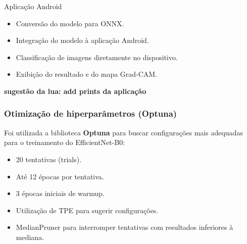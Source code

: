 \begin{frame}{Aplicação Android}
	\begin{itemize}
		\item Conversão do modelo para ONNX.
		\item Integração do modelo à aplicação Android.
		\item Classificação de imagens diretamente no dispositivo.
		\item  Exibição do resultado e do mapa Grad-CAM.
	\end{itemize}
	
	\textbf{sugestão da lua: add prints da aplicação}
	
\end{frame}


\begin{frame}
	
	\frametitle{Otimização de hiperparâmetros (Optuna)}
	Foi utilizada a biblioteca \textbf{Optuna} para buscar configurações mais adequadas para o treinamento do EfficientNet-B0:
	\begin{itemize}
		\item 20 tentativas (trials).
		\item Até 12 épocas por tentativa.
		\item 3 épocas iniciais de warmup.
		\item  Utilização de TPE para sugerir configurações.
		\item MedianPruner para interromper tentativas com resultados inferiores à mediana.
	\end{itemize}
	
\end{frame}

